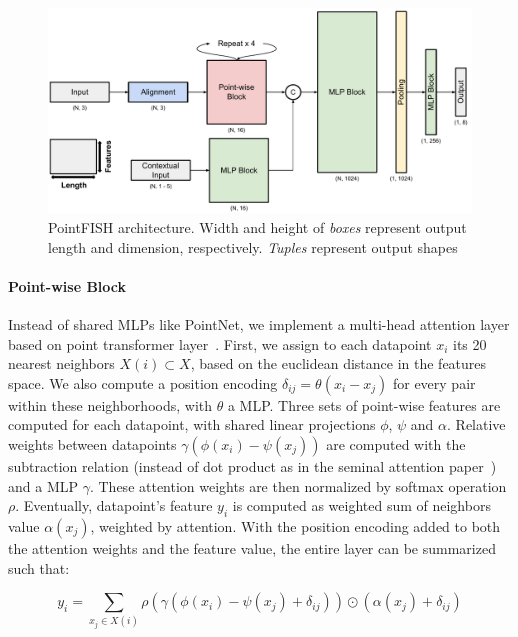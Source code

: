 \begin{figure}[h]
    \centering
    \includegraphics[width=1\textwidth]{figures/chapter4/PointFISH_architecture}
    \caption{PointFISH architecture.
	Width and height of \textit{boxes} represent output length and dimension, respectively.
	\textit{Tuples} represent output shapes}
    \label{fig:PointFISH_architecture}
\end{figure}

\paragraph{Point-wise Block}

Instead of shared MLPs like PointNet, we implement a multi-head attention layer based on point transformer layer~\cite{Zhao_2021_ICCV}.
First, we assign to each datapoint $x_i$ its 20 nearest neighbors $X(i) \subset X$, based on the euclidean distance in the features space.
We also compute a position encoding $\delta_{ij} = \theta(x_i - x_j)$ for every pair within these neighborhoods, with $\theta$ a MLP.
Three sets of point-wise features are computed for each datapoint, with shared linear projections $\phi$, $\psi$ and $\alpha$.
Relative weights between datapoints $\gamma(\phi(x_i) - \psi(x_j))$ are computed with the subtraction relation (instead of dot product as in the seminal attention paper~\cite{NIPS2017_3f5ee243}) and a MLP $\gamma$.
These attention weights are then normalized by softmax operation $\rho$.
Eventually, datapoint's feature $y_i$ is computed as weighted sum of neighbors value $\alpha(x_j)$, weighted by attention.
With the position encoding added to both the attention weights and the feature value, the entire layer can be summarized such that:

\begin{equation}
	{\displaystyle y_i = \sum_{x_j \in X(i)} \rho(\gamma(\phi(x_i) - \psi(x_j) + \delta_{ij})) \odot (\alpha(x_j) + \delta_{ij})}
\end{equation}

